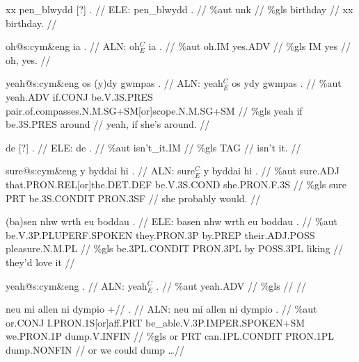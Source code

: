 \documentclass[a4paper,10pt]{article}
\begin{document}
\ex
\begingl[lingstyle=gergl]
\glchat xx pen\_blwydd [?] . //
\glsurface ELE:  pen\_blwydd .  //
\glauto \%aut  unk   //
\glmanual \%gls  birthday   //
\gleng xx birthday. //
\endgl
\xe

\ex
\begingl[lingstyle=gergl]
\glchat oh@s:cym\&eng ia . //
\glsurface ALN:  oh$^{C}_{E}$ ia .  //
\glauto \%aut  oh{\scriptsize .IM} yes{\scriptsize .ADV}   //
\glmanual \%gls  IM yes   //
\gleng oh, yes. //
\endgl
\xe

\ex
\begingl[lingstyle=gergl]
\glchat yeah@s:cym\&eng os (y)dy gwmpas . //
\glsurface ALN:  yeah$^{C}_{E}$ os ydy gwmpas .  //
\glauto \%aut  yeah{\scriptsize .ADV} if{\scriptsize .CONJ} be{\scriptsize .V.3S.PRES} pair{\scriptsize .of.compasses.N.M.SG+SM[or]scope.N.M.SG+SM}   //
\glmanual \%gls  yeah if be{\scriptsize .3S.PRES} around   //
\gleng yeah, if she's around. //
\endgl
\xe

\ex
\begingl[lingstyle=gergl]
\glchat de [?] . //
\glsurface ELE:  de .  //
\glauto \%aut  isn't\_it{\scriptsize .IM}   //
\glmanual \%gls  TAG   //
\gleng isn't it. //
\endgl
\xe

\ex
\begingl[lingstyle=gergl]
\glchat sure@s:cym\&eng y byddai hi . //
\glsurface ALN:  sure$^{C}_{E}$ y byddai hi .  //
\glauto \%aut  sure{\scriptsize .ADJ} that{\scriptsize .PRON.REL[or]the.DET.DEF} be{\scriptsize .V.3S.COND} she{\scriptsize .PRON.F.3S}   //
\glmanual \%gls  sure PRT be{\scriptsize .3S.CONDIT} PRON{\scriptsize .3SF}   //
\gleng she probably would. //
\endgl
\xe

\ex
\begingl[lingstyle=gergl]
\glchat (ba)sen nhw wrth eu boddau . //
\glsurface ELE:  basen nhw wrth eu boddau .  //
\glauto \%aut  be{\scriptsize .V.3P.PLUPERF.SPOKEN} they{\scriptsize .PRON.3P} by{\scriptsize .PREP} their{\scriptsize .ADJ.POSS} pleasure{\scriptsize .N.M.PL}   //
\glmanual \%gls  be{\scriptsize .3PL.CONDIT} PRON{\scriptsize .3PL} by POSS{\scriptsize .3PL} liking   //
\gleng they'd love it //
\endgl
\xe

\ex
\begingl[lingstyle=gergl]
\glchat yeah@s:cym\&eng . //
\glsurface ALN:  yeah$^{C}_{E}$ .  //
\glauto \%aut  yeah{\scriptsize .ADV}   //
\glmanual \%gls     //
\gleng  //
\endgl
\xe

\ex
\begingl[lingstyle=gergl]
\glchat neu mi allen ni dympio +// . //
\glsurface ALN:  neu mi allen ni dympio .  //
\glauto \%aut  or{\scriptsize .CONJ} I{\scriptsize .PRON.1S[or]aff.PRT} be\_able{\scriptsize .V.3P.IMPER.SPOKEN+SM} we{\scriptsize .PRON.1P} dump{\scriptsize .V.INFIN}   //
\glmanual \%gls  or PRT can{\scriptsize .1PL.CONDIT} PRON{\scriptsize .1PL} dump{\scriptsize .NONFIN}   //
\gleng or we could dump \dots  //
\endgl
\xe
\end{document}
